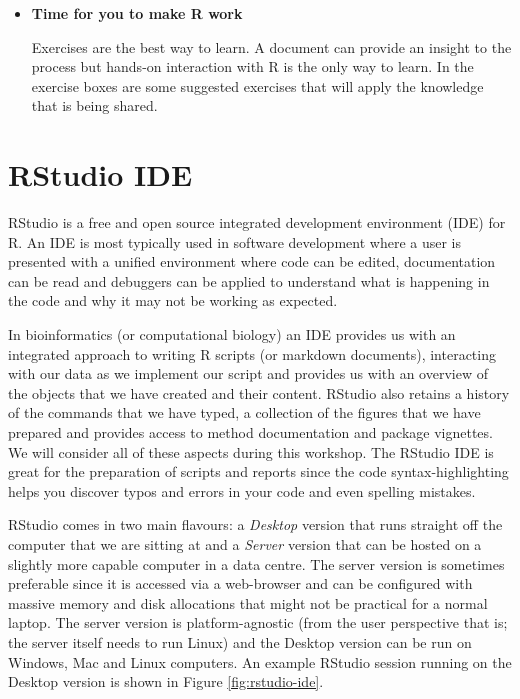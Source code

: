 \documentclass[a4paper]{book}
\newenvironment{rmdblock}[1]
  {\vspace{1.5em}\begin{shaded*}
  \begin{itemize}
  \renewcommand{\labelitemi}{
    \raisebox{-.7\height}[0pt][0pt]{
      {\setkeys{Gin}{width=3em,keepaspectratio}\texttt{[image: images/\#1]}}
    }
  }
  \item
  }
  {
  \end{itemize}
  \end{shaded*}
  }
\newenvironment{rmdexercise}
  {\begin{rmdblock}{exercise}}
  {\end{rmdblock}}
\begin{document}
\begin{rmdexercise}
\textbf{Time for you to make R work}

Exercises are the best way to learn. A document can provide an insight
to the process but hands-on interaction with R is the only way to learn.
In the exercise boxes are some suggested exercises that will apply the
knowledge that is being shared.
\end{rmdexercise}

\section{RStudio IDE}\label{rstudio-ide}

RStudio is a free and open source integrated development environment
(IDE) for R. An IDE is most typically used in software development where
a user is presented with a unified environment where code can be edited,
documentation can be read and debuggers can be applied to understand
what is happening in the code and why it may not be working as expected.

In bioinformatics (or computational biology) an IDE provides us with an
integrated approach to writing R scripts (or markdown documents),
interacting with our data as we implement our script and provides us
with an overview of the objects that we have created and their content.
RStudio also retains a history of the commands that we have typed, a
collection of the figures that we have prepared and provides access to
method documentation and package vignettes. We will consider all of
these aspects during this workshop. The RStudio IDE is great for the
preparation of scripts and reports since the code syntax-highlighting
helps you discover typos and errors in your code and even spelling
mistakes.

RStudio comes in two main flavours: a \emph{Desktop} version that runs
straight off the computer that we are sitting at and a \emph{Server}
version that can be hosted on a slightly more capable computer in a data
centre. The server version is sometimes preferable since it is accessed
via a web-browser and can be configured with massive memory and disk
allocations that might not be practical for a normal laptop. The server
version is platform-agnostic (from the user perspective that is; the
server itself needs to run Linux) and the Desktop version can be run on
Windows, Mac and Linux computers. An example RStudio session running on
the Desktop version is shown in Figure \ref{fig:rstudio-ide}.
\end{document}
